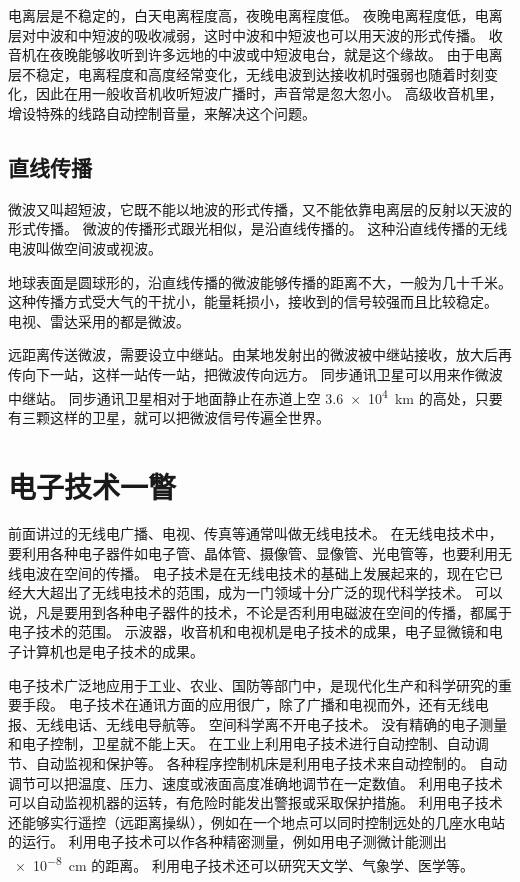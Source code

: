 电离层是不稳定的，白天电离程度高，夜晚电离程度低。
夜晚电离程度低，电离层对中波和中短波的吸收减弱，这时中波和中短波也可以用天波的形式传播。
收音机在夜晚能够收听到许多远地的中波或中短波电台，就是这个缘故。
由于电离层不稳定，电离程度和高度经常变化，无线电波到达接收机时强弱也随着时刻变化，因此在用一般收音机收听短波广播时，声音常是忽大忽小。
高级收音机里，增设特殊的线路自动控制音量，来解决这个问题。

\subsection{直线传播}

微波又叫超短波，它既不能以地波的形式传播，又不能依靠电离层的反射以天波的形式传播。
微波的传播形式跟光相似，是沿直线传播的。
这种沿直线传播的无线电波叫做空间波或视波。

地球表面是圆球形的，沿直线传播的微波能够传播的距离不大，一般为几十千米。
这种传播方式受大气的干扰小，能量耗损小，接收到的信号较强而且比较稳定。
电视、雷达采用的都是微波。

远距离传送微波，需要设立中继站。由某地发射出的微波被中继站接收，放大后再传向下一站，这样一站传一站，把微波传向远方。
同步通讯卫星可以用来作微波中继站。
同步通讯卫星相对于地面静止在赤道上空 \qty{3.6e4}{km} 的高处，只要有三颗这样的卫星，就可以把微波信号传遍全世界。

\section{电子技术一瞥}
前面讲过的无线电广播、电视、传真等通常叫做无线电技术。
在无线电技术中，要利用各种电子器件如电子管、晶体管、摄像管、显像管、光电管等，也要利用无线电波在空间的传播。
电子技术是在无线电技术的基础上发展起来的，现在它已经大大超出了无线电技术的范围，成为一门领域十分广泛的现代科学技术。
可以说，凡是要用到各种电子器件的技术，不论是否利用电磁波在空间的传播，都属于电子技术的范围。
示波器，收音机和电视机是电子技术的成果，电子显微镜和电子计算机也是电子技术的成果。

电子技术广泛地应用于工业、农业、国防等部门中，是现代化生产和科学研究的重要手段。
电子技术在通讯方面的应用很广，除了广播和电视而外，还有无线电报、无线电话、无线电导航等。
空间科学离不开电子技术。
没有精确的电子测量和电子控制，卫星就不能上天。
在工业上利用电子技术进行自动控制、自动调节、自动监视和保护等。
各种程序控制机床是利用电子技术来自动控制的。
自动调节可以把温度、压力、速度或液面高度准确地调节在一定数值。
利用电子技术可以自动监视机器的运转，有危险时能发出警报或采取保护措施。
利用电子技术还能够实行遥控（远距离操纵），例如在一个地点可以同时控制远处的几座水电站的运行。
利用电子技术可以作各种精密测量，例如用电子测微计能测出 \qty{e-8}{cm} 的距离。
利用电子技术还可以研究天文学、气象学、医学等。

